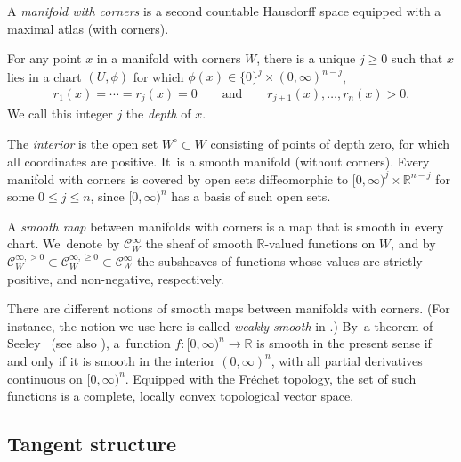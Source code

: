 \documentclass[10pt]{amsart}
\theoremstyle{definition}
\theoremstyle{remark}
\newenvironment{remark}
  {\pushQED{\qed}\renewcommand{\qedsymbol}{$\lozenge$}\remarkx}
  {\popQED\endremarkx}
\let\defn\emph
\newcommand{\RR}{\mathbb{R}}
\newcommand{\halfspc}[1]{[0,\infty)^{#1}}
\renewcommand{\le}{\leqslant}
\renewcommand{\ge}{\geqslant}
\newcommand{\Cinf}[1]{\mathscr{C}^{\infty}_{#1}}
\newcommand{\Cinfpos}[1]{\mathscr{C}^{\infty, > 0}_{#1}}
\newcommand{\Cinfge}[1]{\mathscr{C}^{\infty, \ge 0}_{#1}}
\begin{document}
\begin{definition}\label{def:mfld-with-corners}
A \defn{manifold with corners} is a second countable Hausdorff space equipped with a maximal atlas (with corners).
\end{definition}
For any point $x$ in a manifold with corners $W$, there is a unique $j \ge0$ such that $x$ lies in a chart $(U,\phi)$ for which $\phi(x) \in \{0\}^j \times (0,\infty)^{n-j}$, \ie
\begin{align}
r_1(x)=\cdots=r_j(x)=0 \qquad \textrm{and} \qquad r_{j+1}(x),\ldots,r_n(x) > 0. \label{eq:good-coords}
\end{align}
We call this integer $j$ the \defn{depth} of $x$.

The \defn{interior} is the open set $W^\circ \subset W$ consisting of points of depth zero, \ie for which all coordinates are positive. It~is a smooth manifold (without corners).
\begin{remark}
Every manifold with corners is covered by open sets diffeomorphic to $\halfspc{j}\times\RR^{n-j}$ for some $0\le j\le n$, since $\halfspc{n}$ has a basis of such open sets.
\end{remark}

\begin{definition}
A \defn{smooth map} between manifolds with corners is a map that is smooth in every chart. We~denote by $\Cinf{W}$ the sheaf of smooth $\RR$-valued functions on $W$, and by $\Cinfpos{W}\subset\Cinfge{W}\subset\Cinf{W}$ the subsheaves of functions whose values are strictly positive, and non-negative, respectively.
\end{definition}
\begin{remark}\label{rem:Ck-topology}
There are different notions of smooth maps between manifolds with corners. (For instance, the notion we use here is called \emph{weakly smooth} in \cite{Joyce:ManifoldsWithCorners}.) By~a theorem of Seeley~\cite{Seeley} (see also \cite{Melrose1996}), a~function $f\colon [0,\infty)^n \to \RR$ is smooth in the present sense if and only if it is smooth in the interior $(0,\infty)^n$, with all partial derivatives continuous on $\halfspc{n}$. Equipped with the Fréchet topology, the set of such functions is a complete, locally convex topological vector space.
\end{remark}

\subsection{Tangent structure}\label{sec:tangent-structure-manifolds-with-corners}
\end{document}
